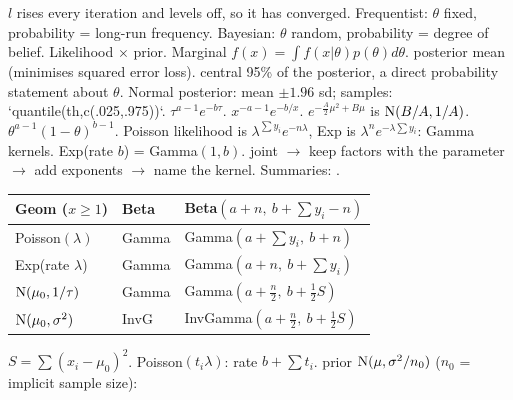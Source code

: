 \li{} $l$ rises every iteration and levels off, so it has converged.
 Frequentist: $\theta$ fixed, probability = long-run frequency. Bayesian: $\theta$ random, probability = degree of belief.
Likelihood $\times$ prior. Marginal $f(x)=\int f(x|\theta)p(\theta)d\theta$.  posterior mean (minimises squared error loss).  central 95\% of the posterior, a direct probability statement about $\theta$. Normal posterior: mean $\pm1.96$ sd; samples: `quantile(th,c(.025,.975))`.
\sk{}  $\tau^{a-1}e^{-b\tau}$.  $x^{-a-1}e^{-b/x}$.  $e^{-\frac A2\mu^2+B\mu}$ is $\mathrm{N}(B/A,1/A)$.  $\theta^{a-1}(1-\theta)^{b-1}$.
\sk{} Poisson likelihood is $\lambda^{\sum y_i}e^{-n\lambda}$, Exp is $\lambda^ne^{-\lambda\sum y_i}$: Gamma kernels. Exp(rate $b$) = Gamma$(1,b)$.
\sk{} joint $\to$ keep factors with the parameter $\to$ add exponents $\to$ name the kernel. Summaries: . 
{\renewcommand{\arraystretch}{1.12}%
\begin{tabular}{@{}|p{31pt}|p{18pt}|p{73pt}|@{}}\hline
Geom ($x{\ge}1$)&Beta&Beta$(a+n,\ b+\sum y_i-n)$\\\hline
Poisson$(\lambda)$&Gamma&Gamma$(a+\sum y_i,\ b+n)$\\\hline
Exp(rate $\lambda$)&Gamma&Gamma$(a+n,\ b+\sum y_i)$\\\hline
$\mathrm{N}(\mu_0,1/\tau)$&Gamma&Gamma$(a+\frac n2,\ b+\frac12S)$\\\hline
$\mathrm{N}(\mu_0,\sigma^2)$&InvG&InvGamma$(a+\frac n2,\ b+\frac12S)$\\\hline
\end{tabular}}
$S=\sum(x_i-\mu_0)^2$.  Poisson$(t_i\lambda)$: rate $b+\sum t_i$.
\sk{} prior $\mathrm{N}(\mu,\sigma^2/n_0)$ ($n_0$ = implicit sample size):
